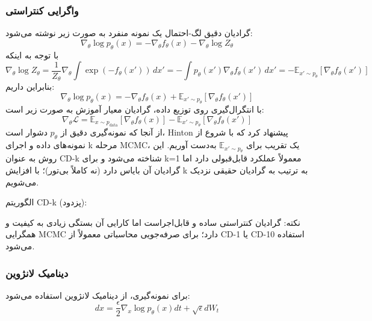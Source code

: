 \subsubsection{واگرایی کنتراستی}
گرادیان دقیق لگ‌-احتمال یک نمونه منفرد به صورت زیر نوشته می‌شود:
\[
\nabla_\theta \log p_\theta(x) = -\nabla_\theta f_\theta(x) - \nabla_\theta \log Z_\theta
\]
با توجه به اینکه
\[
\nabla_\theta \log Z_\theta = \frac{1}{Z_\theta} \nabla_\theta \int \exp(-f_\theta(x')) \, dx' = -\int p_\theta(x') \nabla_\theta f_\theta(x') \, dx' = -\mathbb{E}_{x' \sim p_\theta}[\nabla_\theta f_\theta(x')]
\]
بنابراین داریم:
\[
\nabla_\theta \log p_\theta(x) = -\nabla_\theta f_\theta(x) + \mathbb{E}_{x' \sim p_\theta}[\nabla_\theta f_\theta(x')]
\]
با انتگرال‌گیری روی توزیع داده، گرادیان معیار آموزش به صورت زیر است:
\[
\nabla_\theta \mathcal{L} = \mathbb{E}_{x \sim p_{\text{data}}}[\nabla_\theta f_\theta(x)] - \mathbb{E}_{x' \sim p_\theta}[\nabla_\theta f_\theta(x')]
\]
از آنجا که نمونه‌گیری دقیق از \(p_\theta\) دشوار است، Hinton پیشنهاد کرد که با شروع از نمونه‌های داده و اجرای k مرحله MCMC، یک تقریب برای \(\mathbb{E}_{x' \sim p_\theta}\) به‌دست آوریم. این روش به عنوان CD-k شناخته می‌شود و برای k=1 معمولاً عملکرد قابل‌قبولی دارد اما گرادیان آن بایاس دارد (نه کاملاً بی‌تور)؛ با افزایش k به ترتیب به گرادیان حقیقی نزدیک می‌شویم.

الگوریتم CD-k (پزدود):
\begin{algorithm}[H]
\caption{CD-k}
\begin{latin}
\end{latin}
\end{algorithm}

نکته: گرادیان کنتراستی ساده و قابل‌اجراست اما کارایی آن بستگی زیادی به کیفیت و همگرایی MCMC دارد؛ برای صرفه‌جویی محاسباتی معمولاً از CD-1 یا CD-10 استفاده می‌شود.

\subsubsection{دینامیک لانژوین}
برای نمونه‌گیری، از دینامیک لانژوین استفاده می‌شود:
\[
dx = \frac{\epsilon}{2} \nabla_x \log p_\theta(x) dt + \sqrt{\epsilon} dW_t
\]

